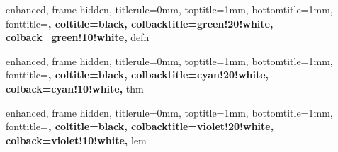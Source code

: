 
{
	enhanced,
	frame hidden,
	titlerule=0mm,
	toptitle=1mm,
	bottomtitle=1mm,
	fonttitle=\bfseries\large,
	coltitle=black,
	colbacktitle=green!20!white,
	colback=green!10!white,
}{defn}



{
	enhanced,
	frame hidden,
	titlerule=0mm,
	toptitle=1mm,
	bottomtitle=1mm,
	fonttitle=\bfseries\large,
	coltitle=black,
	colbacktitle=cyan!20!white,
	colback=cyan!10!white,
}{thm}



{
	enhanced,
	frame hidden,
	titlerule=0mm,
	toptitle=1mm,
	bottomtitle=1mm,
	fonttitle=\bfseries\large,
	coltitle=black,
	colbacktitle=violet!20!white,
	colback=violet!10!white,
}{lem}


\newenvironment{lempf}{
	{\noindent{\it \textbf{Proof for Lemma}}}
	\tcolorbox[blanker,breakable,left=5mm,parbox=false,
	before upper={\parindent15pt},
	after skip=10pt,
	borderline west={1mm}{0pt}{violet!20!white}]
}{
	\textcolor{violet!20!white}{\hbox{}\nobreak\hfill$\blacksquare$} 
	\endtcolorbox
}

